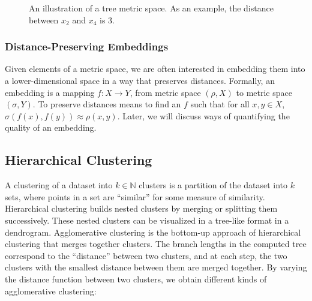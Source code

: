 \documentclass{article}
\begin{document}
\begin{figure}[H]
  \centering
  \caption{An illustration of a tree metric space. As an example, the distance between $x_2$ and $x_4$ is $3$.}
  \label{fig:tree-metric-space}
\end{figure}

\subsubsection{Distance-Preserving Embeddings}

Given elements of a metric space, we are often interested in embedding them into a lower-dimensional space in a way that preserves distances. Formally, an embedding is a mapping $f: X \rightarrow Y$, from metric space $(\rho, X)$ to metric space $(\sigma, Y)$. To preserve distances means to find an $f$ such that for all $x,y \in X$, $\sigma(f(x),f(y)) \approx \rho(x,y)$. Later, we will discuss ways of quantifying the quality of an embedding.

\subsection{Hierarchical Clustering}

A clustering of a dataset into $k \in \mathbb{N}$ clusters is a partition of the dataset into $k$ sets, where points in a set are ``similar'' for some measure of similarity. Hierarchical clustering builds nested clusters by merging or splitting them successively. These nested clusters can be visualized in a tree-like format in a dendrogram. Agglomerative clustering is the bottom-up approach of hierarchical clustering that merges together clusters. The branch lengths in the computed tree correspond to the ``distance'' between two clusters, and at each step, the two clusters with the smallest distance between them are merged together. By varying the distance function between two clusters, we obtain different kinds of agglomerative clustering: \cite{murtagh2012algorithms} \cite{müllner2011modernhierarchicalagglomerativeclustering}
\end{document}

